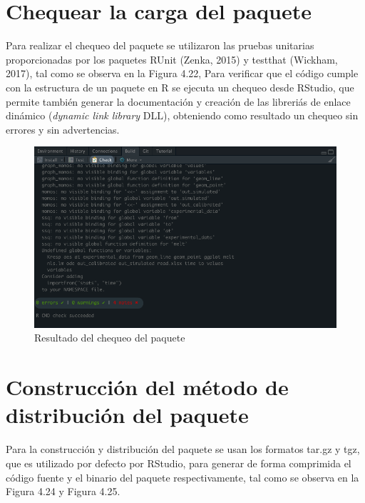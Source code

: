 \section{Chequear la carga del paquete}

Para realizar el chequeo del paquete se utilizaron las pruebas unitarias proporcionadas por los paquetes RUnit (Zenka, 2015) y testthat (Wickham, 2017), tal como se observa en la Figura 4.22, Para verificar que el c\'odigo cumple con la estructura de un paquete en R se ejecuta un chequeo desde RStudio, que permite tambi\'en generar la documentaci\'on  y creaci\'on de las libreri\'as de enlace din\'amico (\textit{dynamic link library} DLL), obteniendo como resultado un chequeo sin errores y sin advertencias.\\

\begin{figure}[H]
  \centering
    \begin{minipage}{1\textwidth}
      \centering
      \includegraphics[width=1\textwidth]{figure_4_23.png}
      \caption{Resultado del chequeo del paquete}
      \label{fig:Fig}
    \end{minipage}%
    \hspace{5mm}
\end{figure}

\section{Construcci\'on del m\'etodo de distribuci\'on del paquete}

Para la construcci\'on y distribuci\'on del paquete se usan los formatos tar.gz y tgz, que es utilizado por defecto por RStudio, para generar de forma comprimida el c\'odigo fuente y el binario del paquete respectivamente, tal como se observa en la Figura 4.24 y Figura 4.25.\\

